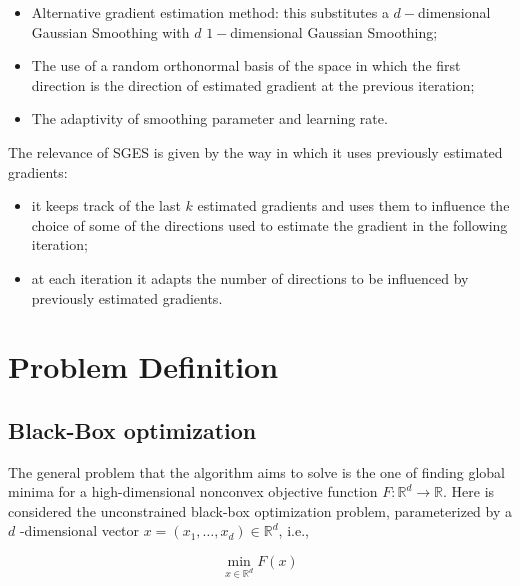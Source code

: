 \begin{itemize}
	
    \item Alternative gradient estimation method: this substitutes a $d-$dimensional Gaussian Smoothing with $d$ $1-$dimensional Gaussian Smoothing;
    \item The use of a random orthonormal basis of the space in which the first direction is the direction of estimated gradient at the previous iteration;
    \item The adaptivity of smoothing parameter and learning rate.
    
\end{itemize}
The relevance of SGES is given by the way in which it uses previously estimated gradients: 
\begin{itemize}
	\item it keeps track of the last $k$ estimated gradients and uses them to influence the choice of some of the directions used to estimate the gradient in the following iteration;
	\item at each iteration it adapts the number of directions to be influenced by previously estimated gradients.
\end{itemize}

\section{Problem Definition}

\subsection{Black-Box optimization}

The general problem that the algorithm aims to solve is the one of finding global minima for a high-dimensional nonconvex objective function $F: \mathbb{R}^{d} \rightarrow \mathbb{R}$. Here is considered the unconstrained black-box optimization problem, parameterized by a $d$ -dimensional vector $x=\left(x_{1}, \ldots, x_{d}\right) \in \mathbb{R}^{d}$, i.e.,

\begin{equation}\label{problem}  
    \min _{x \in \mathbb{R}^{d}} F(x)  
\end{equation}

